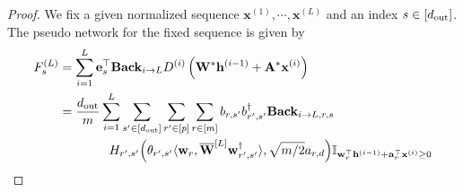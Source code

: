 \begin{proof}
	We fix a given normalized sequence $\mathbf{x}^{(1)}, \cdots, \mathbf{x}^{(L)}$ and an index $s \in [d_{\mathrm{out}} ]$.
	The pseudo network for the fixed sequence is given by
	\begingroup \allowdisplaybreaks
	\begin{align}
		F_{s}^{(L)} &= \sum_{i=1}^{L} \mathbf{e}_{s}^{\top} \mathbf{Back}_{i \rightarrow L} D^{(i)} \left(\mathbf{W}^{\ast} \mathbf{h}^{(i-1)} + \mathbf{A}^{\ast} \mathbf{x}^{(i)}\right) \nonumber\\
		&= \frac{\dout }{m} \sum_{i=1}^{L}  \sum_{s' \in [\dout ]} \sum_{r' \in [p]} \sum_{r \in [m]}  b_{r, s'} b_{r', s'}^{\dagger} \mathbf{Back}_{i \to L, r, s} \nonumber\\& \quad \quad \quad \quad H_{r', s'}\Big(\theta_{r', s'} \langle \mathbf{w}_{r}, \overline{\mathbf{W}}^{[L]} \mathbf{w}_{r', s'}^{\dagger}\rangle , \sqrt{m/2} a_{r, d}\Big) \mathbb{I}_{\mathbf{w}_r^{\top} \mathbf{h}^{(i-1)} + \mathbf{a}_r^{\top} \mathbf{x}^{(i)} \ge 0} %

\end{align}
\end{proof}
